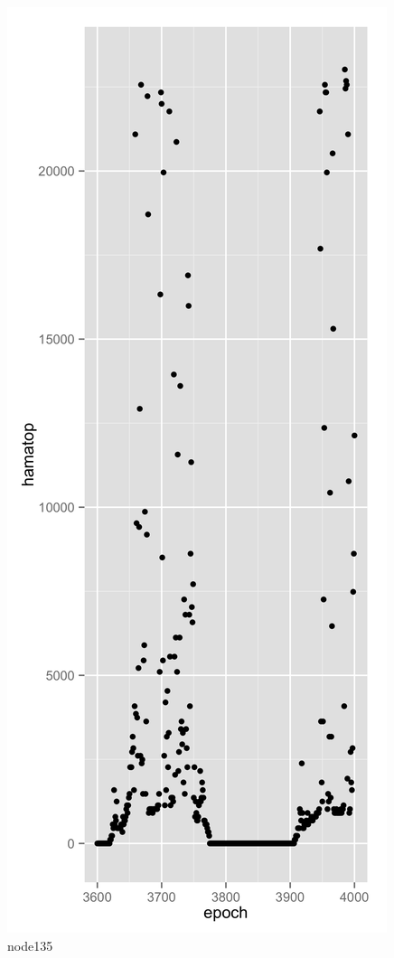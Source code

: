 \documentclass[english]{article}\usepackage[]{graphicx}\usepackage[]{color}
\begin{document}
\begin{figure}
 \vspace{-40pt}
  \begin{center}
    \includegraphics[scale=0.1]{node135example.png}
  \end{center}
   \vspace{-20pt}
  \caption{node135}
\end{figure}
\end{document}
